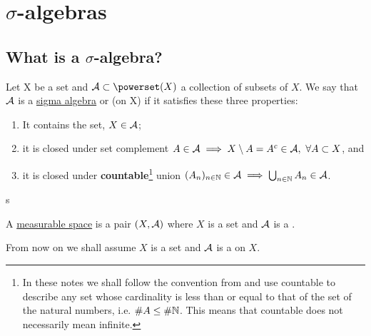 
\chapter{\texorpdfstring{$\sigma$-algebras}{Sigma algebras}}

\section{What is a \texorpdfstring{$\sigma$-algebra}{sigma algebra}?}

\begin{dfn}
	Let X be a set and $\sa \subset \powerset(X)$ a collection of subsets of $X$. We say that $\mathcal{A}$ is a \underline{sigma algebra} or \siga (on X) if it satisfies these three properties:
	\begin{enumerate}
		\item It contains the set, $X \in \mathcal{A}$;
		\item it is closed under set complement $A \in \mathcal{A} \implies X \setminus A = A^c \in \mathcal{A},\ \forall A \subset X$, and
		\item it is closed under \textbf{countable}\footnote{In these notes we shall follow the convention from \cite[bottom of p. 8]{schilling2005} and use countable to describe any set whose cardinality is less than or equal to that of the set of the natural numbers, i.e. $\# A \leq \# \mathbb{N}$. This means that countable does not necessarily mean infinite.} union $(A_n)_{n \in \mathbb{N}} \in \mathcal{A} \implies \bigcup_{n \in \mathbb{N}} A_n \in \mathcal{A}$.
	\end{enumerate}
\end{dfn}
s
\begin{dfn}
	A \underline{measurable space} is a pair $(X, \mathcal{A})$ where $X$ is a set and $\mathcal{A}$ is a \siga.
\end{dfn}

From now on we shall assume $X$ is a set and $\mathcal{A}$ is a \siga on $X$.

